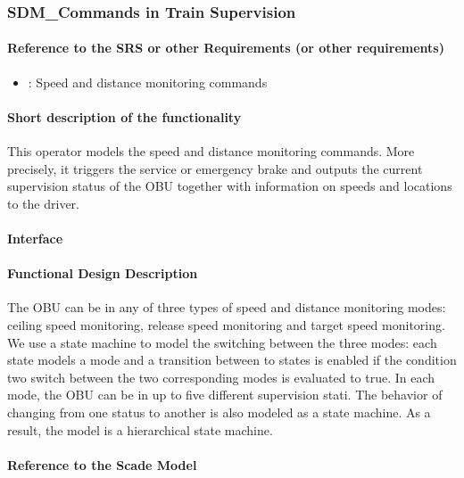 \subsubsection{SDM\_Commands in Train Supervision}

\paragraph{Reference to the SRS or other Requirements (or other requirements)}
\begin{itemize}
	\item \cite[Chapt.~3.13.10]{subset-026}: Speed and distance monitoring commands 
\end{itemize}

\paragraph{Short description of the functionality}
This operator models the speed and distance monitoring commands. More precisely, it triggers the service or emergency brake and outputs the current supervision status of the OBU together with information on speeds and locations to the driver.

\paragraph{Interface}

\paragraph{Functional Design Description}
The OBU can be in any of three types of speed and distance monitoring modes: ceiling speed monitoring, release speed monitoring and target speed monitoring. We use a state machine to model the switching between the three modes: each state models a mode and a transition between to states is enabled if the condition two switch between the two corresponding modes is evaluated to true. In each mode, the OBU can be in up to five different supervision stati. The behavior of changing from one status to another is also modeled as a state machine. As a result, the model is a hierarchical state machine.

\paragraph{Reference to the Scade Model}


